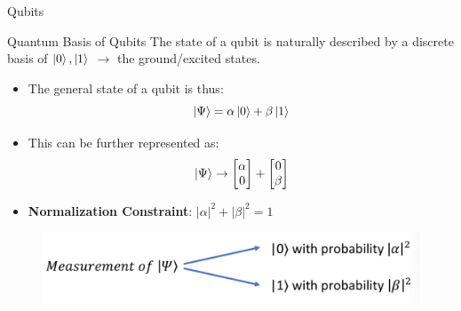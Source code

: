 \documentclass{beamer}
\begin{document}
\begin{frame}{Qubits}
	\begin{block}{Quantum Basis of Qubits}
		The state of a qubit is naturally described by a discrete basis of ${ \ket{0}, \ket{1}}$ $\rightarrow$ the ground/excited states.
	\end{block}
	\begin{itemize}
		\item The general state of a qubit is thus:
		      \begin{equation}
			      \ket{\Psi} = \alpha \ket{0} + \beta \ket{1}
		      \end{equation}
		\item This can be further represented as:
		      \begin{equation}
			      \ket{\Psi} \rightarrow \begin{bmatrix} \alpha \\ 0  \end{bmatrix} + \begin{bmatrix} 0 \\ \beta \end{bmatrix}
		      \end{equation}
		\item \textbf{Normalization Constraint}: $|\alpha|^2 + |\beta|^2 = 1$
	\end{itemize}
	\begin{figure}[Measurement of a qubit]
		\centering
		\includegraphics[scale=.3]{./measurement.png}
	\end{figure}

\end{frame}

\end{document}
